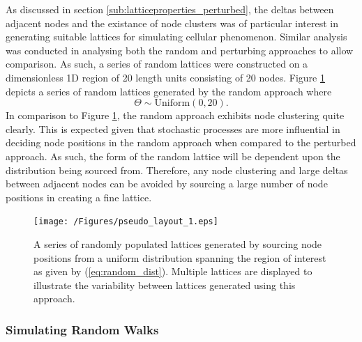 \documentclass[11pt,a4paper]{article}
\begin{document}
			As discussed in section \ref{sub:latticeproperties_perturbed}, the deltas between adjacent nodes and the existance of node clusters was of particular interest in generating suitable lattices for simulating cellular phenomenon. Similar analysis was conducted in analysing both the random and perturbing approaches to allow comparison. As such, a series of random lattices were constructed on a dimensionless 1D region of 20 length units consisting of 20 nodes. Figure \ref{fig:pseudo_layout_1} depicts a series of random lattices generated by the random approach where
			\begin{equation}
				\label{eq:random_dist}
				\Theta \sim \text{Uniform} \left(0, 20\right).	
			\end{equation}
			In comparison to Figure \ref{fig:pseudo_layout_1}, the random approach exhibits node clustering quite clearly. This is expected given that stochastic processes are more influential in deciding node positions in the random approach when compared to the perturbed approach. As such, the form of the random lattice will be dependent upon the distribution being sourced from. Therefore, any node clustering and large deltas between adjacent nodes can be avoided by sourcing a large number of node positions in creating a fine lattice.

			\begin{figure}[tbh]
				\centering
					\texttt{[image: /Figures/pseudo\_layout\_1.eps]}
				\caption{A series of randomly populated lattices generated by sourcing node positions from a uniform distribution spanning the region of interest as given by (\ref{eq:random_dist}). Multiple lattices are displayed to illustrate the variability between lattices generated using this approach.}
				\label{fig:pseudo_layout_1}
			\end{figure}


		\subsubsection{Simulating Random Walks}
		\label{sub:simulatingrandomwalks_random}
			
\end{document}
